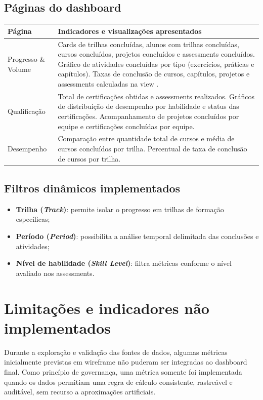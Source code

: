 \documentclass[11pt,a4paper]{article}
\begin{document}
\subsection{Páginas do dashboard}

\begin{longtable}{L{42mm}L{104mm}}
\toprule
\textbf{Página} & \textbf{Indicadores e visualizações apresentados} \\
\midrule
\endhead
Progresso \& Volume & Cards de trilhas concluídas, alunos com trilhas concluídas, cursos concluídos, projetos concluídos e assessments concluídos. Gráfico de atividades concluídas por tipo (exercícios, práticas e capítulos). Taxas de conclusão de cursos, capítulos, projetos e assessments calculadas na view . \\
\addlinespace
Qualificação & Total de certificações obtidas e assessments realizados. Gráficos de distribuição de desempenho por habilidade e status das certificações. Acompanhamento de projetos concluídos por equipe e certificações concluídas por equipe. \\
\addlinespace
Desempenho & Comparação entre quantidade total de cursos e média de cursos concluídos por trilha. Percentual de taxa de conclusão de cursos por trilha. \\
\bottomrule
\end{longtable}

\subsection{Filtros dinâmicos implementados}

\begin{itemize}
  \item \textbf{Trilha (\textit{Track})}: permite isolar o progresso em trilhas de formação específicas;
  \item \textbf{Período (\textit{Period})}: possibilita a análise temporal delimitada das conclusões e atividades;
  \item \textbf{Nível de habilidade (\textit{Skill Level})}: filtra métricas conforme o nível avaliado nos assessments.
\end{itemize}

\section{Limitações e indicadores não implementados}

Durante a exploração e validação das fontes de dados, algumas métricas inicialmente
previstas em wireframe não puderam ser integradas ao dashboard final. Como princípio
de governança, uma métrica somente foi implementada quando os dados permitiam uma regra
de cálculo consistente, rastreável e auditável, sem recurso a aproximações artificiais.
\end{document}
